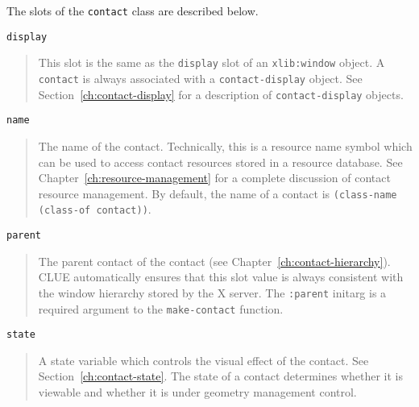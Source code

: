 \documentclass[twoside]{book}
\begin{document}
\begin{sloppy}
The slots of the {\tt contact} class are described below.

\begin{flushright} \parbox[t]{6.125in}{
{\tt display}
\begin{quote}
This slot is the same as the {\tt display} slot of an {\tt xlib:window} object.
A {\tt contact} is
always associated with a {\tt contact-display} object.
See Section~\ref{ch:contact-display} for a
description of {\tt contact-display} objects.\end{quote}

}\end{flushright}

\begin{flushright} \parbox[t]{6.125in}{
{\tt name}
\begin{quote}
The name of the contact. Technically, this is
a resource name symbol which can be used to access contact resources
stored in a resource database. See Chapter~\ref{ch:resource-management}
for a complete discussion of contact resource management. 
By default, the name of a contact is {\tt (class-name (class-of contact))}.
\end{quote}

}\end{flushright}

\begin{flushright} \parbox[t]{6.125in}{
{\tt parent}
\begin{quote}
The  parent contact of the contact (see Chapter~\ref{ch:contact-hierarchy}). 
CLUE automatically ensures that this slot value is always consistent with the
window hierarchy stored by the X server.
The {\tt :parent} initarg is a required argument to the {\tt make-contact}
function.
\end{quote}

}\end{flushright}

\begin{flushright} \parbox[t]{6.125in}{
{\tt state}
\begin{quote}
A state variable which controls the visual effect of the contact. See
Section~\ref{ch:contact-state}. The state
of a contact determines whether it is viewable and whether it is under geometry
management control.
\end{quote}

}\end{flushright}



\end{sloppy}
\end{document}
